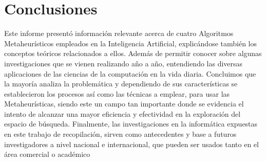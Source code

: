 \documentclass[10pt,conference]{IEEEtran}
\begin{document}
\section{\textbf{Conclusiones}}
Este informe presentó información relevante acerca de cuatro Algoritmos Metaheurísticos empleados en la Inteligencia Artificial, explicándose también los conceptos teóricos relacionados a ellos. Además de permitir conocer sobre algunas investigaciones que se vienen realizando año a año, entendiendo las diversas aplicaciones de las ciencias de la computación en la vida diaria. Concluimos que la mayoría analiza la problemática y dependiendo de sus características se establecieron los procesos así como las técnicas a emplear, para usar las Metaheurísticas, siendo este un campo tan importante donde se evidencia el intento de alcanzar una mayor eficiencia y efectividad en la exploración del espacio de búsqueda. Finalmente, las investigaciones en la informática expuestas en este trabajo de recopilación, sirven como antecedentes y base a futuros investigadores a nivel nacional e internacional, que pueden ser usados tanto en el área comercial o académico
\medskip

\end{document}
